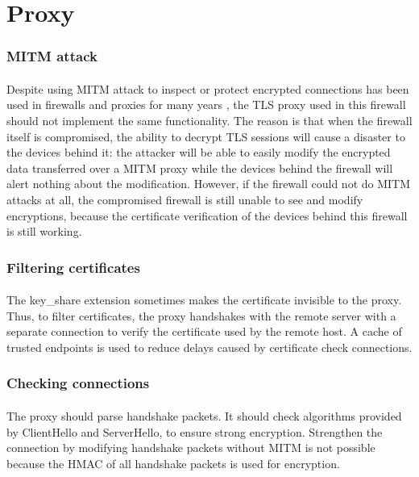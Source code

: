 \documentclass[mscthesis]{usiinfthesis}
\begin{document}
\section{Proxy}
\subsubsection{MITM attack}
\paragraph{}
Despite using MITM attack to inspect or protect encrypted connections has been used in firewalls and proxies for many years \citep{fortigate:deepinspection}, the TLS proxy used in this firewall should not implement the same functionality. The reason is that when the firewall itself is compromised, the ability to decrypt TLS sessions will cause a disaster to the devices behind it: the attacker will be able to easily modify the encrypted data transferred over a MITM proxy while the devices behind the firewall will alert nothing about the modification. However, if the firewall could not do MITM attacks at all, the compromised firewall is still unable to see and modify encryptions, because the certificate verification of the devices behind this firewall is still working.
\subsubsection{Filtering certificates}
\paragraph{}
The key\_share extension sometimes makes the certificate invisible to the proxy. Thus, to filter certificates, the proxy handshakes with the remote server with a separate connection to verify the certificate used by the remote host. A cache of trusted endpoints is used to reduce delays caused by certificate check connections.

\subsubsection{Checking connections}
\paragraph{}
The proxy should parse handshake packets. It should check algorithms provided by ClientHello and ServerHello, to ensure strong encryption. Strengthen the connection by modifying handshake packets without MITM is not possible because the HMAC of all handshake packets is used for encryption.
\end{document}
